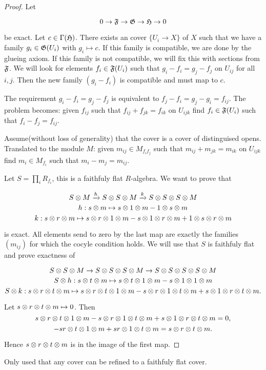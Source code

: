 \begin{proof}
Let

\[0 \rightarrow \mathfrak{F} \rightarrow \mathfrak{G} \rightarrow \mathfrak{H} \rightarrow 0\]

be exact.
Let $c\in \Gamma(\mathfrak{H})$. There exists an cover $\{U_i\rightarrow X\}$ of $X$ such that we have a family $g_i\in \mathfrak{G}(U_i)$ with $g_i\mapsto c$.
If this family is compatible, we are done by the glueing axiom. If this family is not compatible, we will fix this with sections from $\mathfrak{F}$.
We will look for elements $f_i\in \mathfrak{F}(U_i)$ such that $g_i-f_i=g_j-f_j$ on $U_{ij}$ for all $i,j$. 
Then the new family $(g_i-f_i)$ is compatible and must map to $c$.

The requirement $g_i-f_i=g_j-f_j$ is equivalent to $f_j-f_i=g_j-g_i=f_{ij}$. 
The problem becomes: given $f_{ij}$ such that $f_{ij}+f_{jk}=f_{ik}$ on $U_{ijk}$ find $f_i\in\mathfrak{F}(U_i)$ such that $f_i-f_j =f_{ij}$.

Assume(without loss of generality) that the cover is a cover of distinguised opens.
Translated to the module $M$: given $m_{ij}\in M_{f_if_j}$ such that $m_{ij}+m_{jk}=m_{ik}$ on $U_{ijk}$ find $m_i\in M_{f_i}$ such that $m_i-m_j =m_{ij}$.

Let $S=\prod_i R_{f_i}$, this is a faithfuly flat $R$-algebra.
We want to prove that

\[S\otimes M \xrightarrow{h} S\otimes S\otimes M \xrightarrow{k} S\otimes S\otimes S\otimes M \]
\[h:s\otimes m \mapsto s\otimes 1 \otimes m - 1\otimes s\otimes m\]
\[k:s\otimes r\otimes m \mapsto s\otimes r \otimes 1 \otimes m - s\otimes 1 \otimes r \otimes m + 1\otimes s \otimes r \otimes m\]

is exact. All elements send to zero by the last map are exactly the families $(m_{ij})$ for which the cocyle condition holds.
We will use that $S$ is faithfuly flat and prove exactness of 


\[S\otimes S\otimes M \rightarrow S\otimes S\otimes S \otimes M \rightarrow S \otimes S\otimes S\otimes S\otimes M \]
\[S\otimes h:s\otimes t \otimes m \mapsto s\otimes t\otimes 1 \otimes m - s\otimes 1\otimes 1\otimes m \]
\[S\otimes k:s\otimes r\otimes t \otimes m \mapsto s\otimes r \otimes  t \otimes 1 \otimes m - s\otimes r \otimes 1 \otimes t \otimes m + s\otimes 1 \otimes r \otimes t\otimes m.\]


Let $s\otimes r\otimes t\otimes m\mapsto 0$. Then
\[s\otimes r \otimes  t \otimes 1 \otimes m - s\otimes r \otimes 1 \otimes t \otimes m + s\otimes 1 \otimes r \otimes t\otimes m = 0,\]
\[-sr \otimes  t \otimes 1 \otimes m + sr \otimes 1 \otimes t \otimes m = s\otimes r \otimes t\otimes m.\]

Hence $s\otimes r \otimes t\otimes m$ is in the image of the first map. 
\end{proof}

Only used that any cover can be refined to a faithfuly flat cover.

